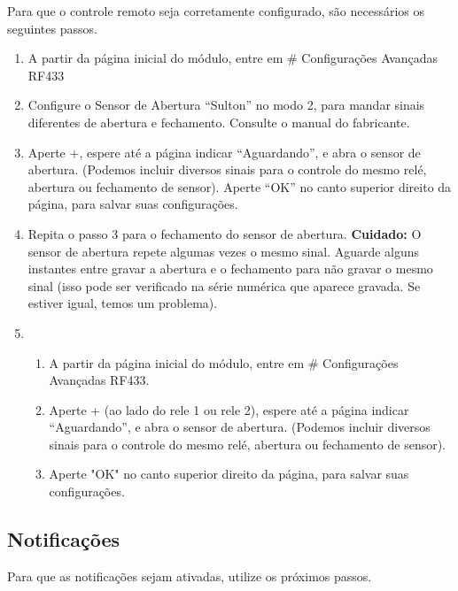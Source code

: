 Para que o controle remoto seja corretamente configurado, são necessários os seguintes passos.
\begin{enumerate}
    \item
    A partir da página inicial do módulo, entre em \# \textrightarrow{} Configurações Avançadas \textrightarrow{} RF433

    \item
    Configure o Sensor de Abertura “Sulton” no modo 2, para mandar sinais diferentes de abertura e fechamento. Consulte o manual do fabricante.

    \item
    Aperte +, espere até a página indicar “Aguardando”, e abra o sensor de abertura. (Podemos incluir diversos sinais para o controle do mesmo relé, abertura ou fechamento de sensor). Aperte “OK” no canto superior direito da página, para salvar suas configurações.

    \item
    Repita o passo 3 para o fechamento do sensor de abertura. \textbf{Cuidado:} O sensor de abertura repete algumas vezes o mesmo sinal. Aguarde alguns instantes entre gravar a abertura e o fechamento para não gravar o mesmo sinal (isso pode ser verificado na série numérica que aparece gravada. Se estiver igual, temos um problema).

    \item
        \begin{enumerate}
            \item
            A partir da página inicial do módulo, entre em \# \textrightarrow{} Configurações Avançadas \textrightarrow{} RF433.

            \item
            Aperte + (ao lado do rele 1 ou rele 2), espere até a página indicar “Aguardando”, e abra o sensor de abertura. (Podemos incluir diversos sinais para o controle do mesmo relé, abertura ou fechamento de sensor).

            \item
            Aperte "OK" no canto superior direito da página, para salvar suas configurações.

        \end{enumerate}
\end{enumerate}

\subsection{Notificações}
Para que as notificações sejam ativadas, utilize os próximos passos.

